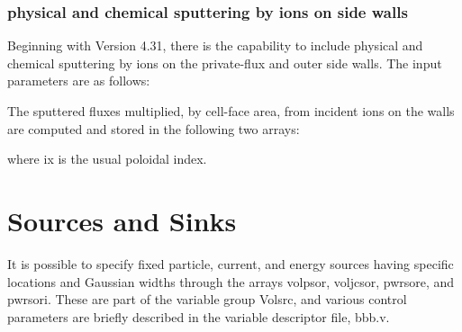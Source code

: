 \documentclass [12pt]{article}
\def\hsa{\hskip.4truein}
\def\hsp6{\hskip.6truein}
\begin{document}
\subsubsection{physical and chemical sputtering by ions on side walls}
Beginning with Version 4.31, there is the capability to include physical and
chemical sputtering by ions on the private-flux and outer side walls.  The
input parameters are as follows: 
{\sf
{}
}

The sputtered fluxes multiplied, by cell-face area, from incident ions on the
walls are computed and stored in the following two arrays:
{\sf
{}
} 
where {\sf ix} is the usual poloidal index.

\section{Sources and Sinks}

It is possible to specify fixed particle, current, and energy sources having
specific locations and Gaussian widths through the arrays {\sf volpsor,
  voljcsor, pwrsore, and pwrsori}.  These are part of the variable group
{\sf Volsrc}, and various control parameters are briefly described in
the variable descriptor file, {\sf bbb.v}.
\end{document}
